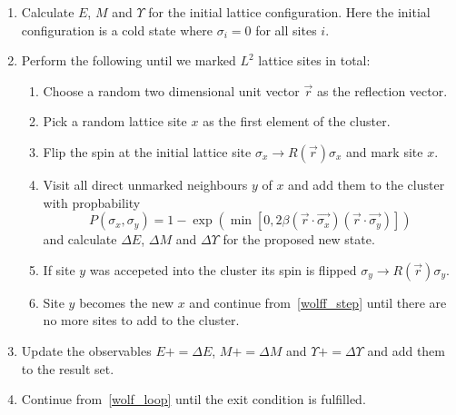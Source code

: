 		\begin{enumerate}
			\item Calculate $E$, $M$ and $\Upsilon$ for the initial lattice configuration. Here the initial configuration is a cold state where $\sigma_i = 0$ for all sites $i$.
			\item \label{wolf_loop} Perform the following until we marked $L^2$ lattice sites in total:
			\begin{enumerate}
				\item Choose a random two dimensional unit vector $\vec{r}$ as the reflection vector.
				\item Pick a random lattice site $x$ as the first element of the cluster.
				\item Flip the spin at the initial lattice site $\sigma_x \rightarrow R(\vec{r}) \sigma_x$ and mark site $x$.
				\item \label{wolff_step} Visit all direct unmarked neighbours $y$ of $x$ and add them to the cluster with propbability
					\begin{equation}\label{eq:wolff}
						P(\sigma_x, \sigma_y) = 1 - \exp(\min[0, 2 \beta (\vec{r}\cdot\vec{\sigma_x}) (\vec{r}\cdot\vec{\sigma_y})])
					\end{equation}
					and calculate $\Delta E$, $\Delta M$ and $\Delta \Upsilon$ for the proposed new state.
				\item If site $y$ was accepeted into the cluster its spin is flipped $\sigma_y \rightarrow R(\vec{r}) \sigma_y$.
				\item Site $y$ becomes the new $x$ and continue from~\cref{wolff_step} until there are no more sites to add to the cluster.
			\end{enumerate}
			\item Update the observables $E \mathrel{{+}{=}} \Delta E$, $M \mathrel{{+}{=}} \Delta M$ and $\Upsilon \mathrel{{+}{=}} \Delta \Upsilon$ and add them to the result set.
			\item Continue from~\cref{wolf_loop} until the exit condition is fulfilled.
		\end{enumerate}
		
		
		
	

